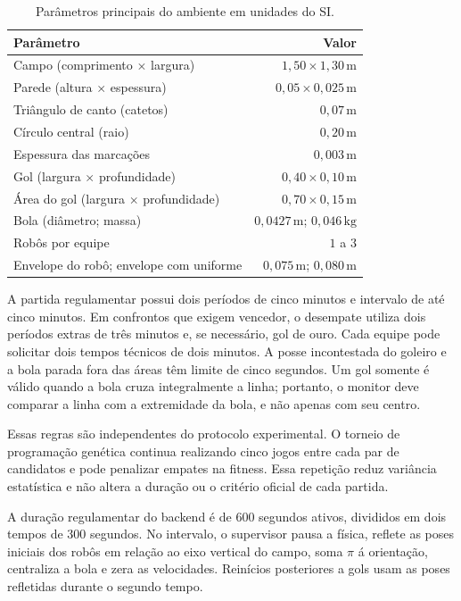 \documentclass[12pt,a4paper]{article}
\begin{document}
\begin{table}[ht]
\centering
\caption{Par\^ametros principais do ambiente em unidades do SI.}
\label{tab:ruleset}
\begin{tabular}{lr}
\toprule
Par\^ametro & Valor \\
\midrule
Campo (comprimento $\times$ largura) & $1{,}50\times1{,}30\,\mathrm{m}$ \\
Parede (altura $\times$ espessura) & $0{,}05\times0{,}025\,\mathrm{m}$ \\
Tri\^angulo de canto (catetos) & $0{,}07\,\mathrm{m}$ \\
C\'irculo central (raio) & $0{,}20\,\mathrm{m}$ \\
Espessura das marca\c{c}\~oes & $0{,}003\,\mathrm{m}$ \\
Gol (largura $\times$ profundidade) & $0{,}40\times0{,}10\,\mathrm{m}$ \\
\'Area do gol (largura $\times$ profundidade) & $0{,}70\times0{,}15\,\mathrm{m}$ \\
Bola (di\^ametro; massa) & $0{,}0427\,\mathrm{m}$; $0{,}046\,\mathrm{kg}$ \\
Rob\^os por equipe & $1$ a $3$ \\
Envelope do rob\^o; envelope com uniforme & $0{,}075\,\mathrm{m}$; $0{,}080\,\mathrm{m}$ \\
\bottomrule
\end{tabular}
\end{table}

A partida regulamentar possui dois per\'iodos de cinco minutos e intervalo de at\'e cinco minutos. Em confrontos que exigem vencedor, o desempate utiliza dois per\'iodos extras de tr\^es minutos e, se necess\'ario, gol de ouro. Cada equipe pode solicitar dois tempos t\'ecnicos de dois minutos. A posse incontestada do goleiro e a bola parada fora das \'areas t\^em limite de cinco segundos. Um gol somente \'e v\'alido quando a bola cruza integralmente a linha; portanto, o monitor deve comparar a linha com a extremidade da bola, e n\~ao apenas com seu centro.

Essas regras s\~ao independentes do protocolo experimental. O torneio de programa\c{c}\~ao gen\'etica continua realizando cinco jogos entre cada par de candidatos e pode penalizar empates na fitness. Essa repeti\c{c}\~ao reduz vari\^ancia estat\'istica e n\~ao altera a dura\c{c}\~ao ou o crit\'erio oficial de cada partida.

A dura\c{c}\~ao regulamentar do backend \'e de 600 segundos ativos, divididos em dois tempos de 300 segundos. No intervalo, o supervisor pausa a f\'isica, reflete as poses iniciais dos rob\^os em rela\c{c}\~ao ao eixo vertical do campo, soma $\pi$ \'a orienta\c{c}\~ao, centraliza a bola e zera as velocidades. Rein\'icios posteriores a gols usam as poses refletidas durante o segundo tempo.
\end{document}
